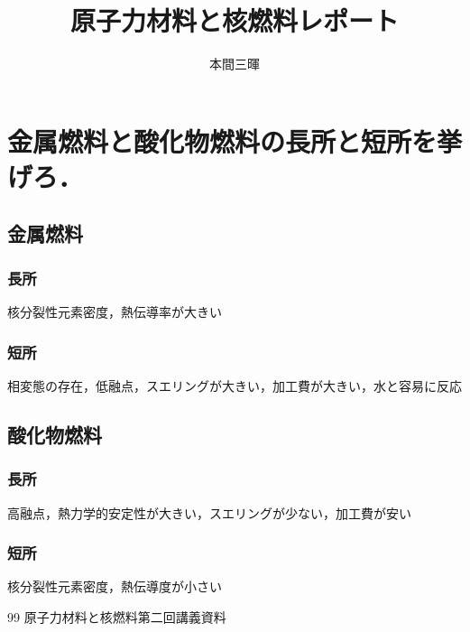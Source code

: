 \documentclass[titlepage,a4paper]{jsarticle}
\title{原子力材料と核燃料レポート}
\author{本間三暉}
\begin{document}
\maketitle
\section{金属燃料と酸化物燃料の長所と短所を挙げろ．}
\subsection{金属燃料}
\subsubsection*{長所}
核分裂性元素密度，熱伝導率が大きい
\subsubsection*{短所}
相変態の存在，低融点，スエリングが大きい，加工費が大きい，水と容易に反応
\subsection{酸化物燃料}
\subsubsection*{長所}
高融点，熱力学的安定性が大きい，スエリングが少ない，加工費が安い
\subsubsection*{短所}
核分裂性元素密度，熱伝導度が小さい



\begin{thebibliography}{99}
\bibitem{} 原子力材料と核燃料第二回講義資料
\end{thebibliography}
\end{document}
